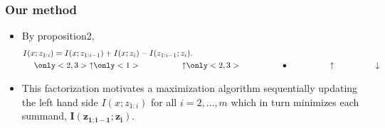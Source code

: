 \documentclass[10pt,mathserif]{beamer}
\begin{document}
\begin{frame}
\frametitle{Our method}
\begin{itemize}\itemsep=20pt
\item By proposition2,
\begin{align}
&I(x;z_{1:i}) = I(x;z_{1:i-1}) + I(x;z_{i}) - I(z_{1:i-1};z_{i}).\nonumber\\
&~~~~\only<2,3>{\uparrow} \only<1>{\qquad\qquad\quad\uparrow} \only<2,3>{\qquad\qquad\quad\bullet\quad\qquad\qquad\uparrow\qquad\qquad\quad\downarrow}\nonumber
\end{align}
\item This factorization motivates a maximization algorithm sequentially updating the left hand side $I(x; z_{1:i})$ for all $i=2,\ldots,m$ which in turn minimizes each summand, $\mathbf{I(z_{1:i-1};z_i)}$.
\end{itemize}
\end{frame}
\end{document}
